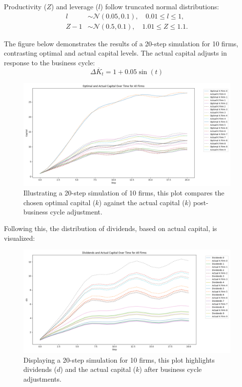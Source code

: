 \documentclass[12pt]{article}
\begin{document}
Productivity (\( Z \)) and leverage (\( l \)) follow truncated normal distributions:
\begin{align}
    l &\sim \mathcal{N}(0.05, 0.1), \quad 0.01 \leq l \leq 1, \\
    Z-1 &\sim \mathcal{N}(0.5, 0.1), \quad 1.01 \leq Z \leq 1.1.
\end{align}

The figure below demonstrates the results of a 20-step simulation for 10 firms, contrasting optimal and actual capital
levels.  The actual capital adjusts in response to the business cycle:
\[
\Delta \overline{K}_t = 1 + 0.05 \sin(t)
\]

\begin{figure}[H]
    \centering
    \includegraphics[scale=0.4]{OptimalK_noexit.png}
    \caption{Illustrating a 20-step simulation of 10 firms, this plot compares the chosen optimal capital (\(k\))
    against the
     actual capital (\(k\)) post-business cycle adjustment.}
    \label{fig:optKnoE}
\end{figure}

Following this, the distribution of dividends, based on actual capital, is visualized:
\begin{figure}[H]
    \centering
    \includegraphics[scale=0.4]{div_cap_noexit.png}
    \caption{Displaying a 20-step simulation for 10 firms, this plot highlights dividends (\( d \)) and the actual capital
    (\(k\)) after business cycle
     adjustments.}
    \label{fig:divNoExit}
\end{figure}
\end{document}
